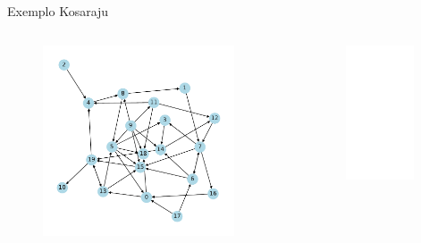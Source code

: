 \documentclass[aspectratio=169,usenames,dvipsnames]{beamer}
\begin{document}
\begin{frame}{Exemplo Kosaraju}

  \begin{columns}
  \begin{figure}[ht]
  \centering
  \includegraphics[width=0.9\textwidth]{figs/strong_components_0.pdf}
  \end{figure}
  \begin{figure}[ht]
  \centering
  \includegraphics<2>[width=0.9\textwidth]{figs/strong_components_1.pdf}
  \end{figure}
  \end{columns}

\end{frame}
\end{document}
